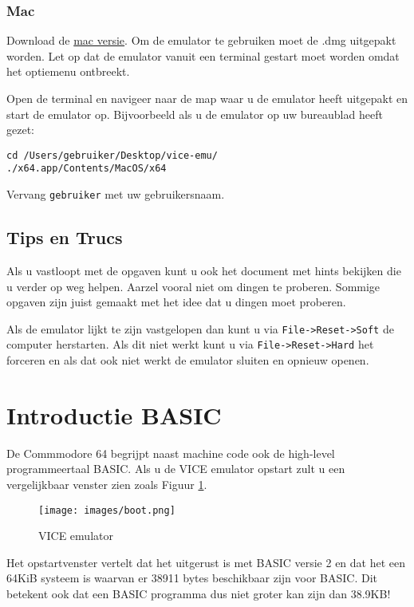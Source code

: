 \documentclass{article}
\begin{document}
\subsubsection{Mac}
Download de \href{http://sourceforge.net/projects/vice-emu/files/releases/binaries/macosx/vice-macosx-sdl-x86_64-10.12-3.1.dmg/download}{mac versie}.
Om de emulator te gebruiken moet de .dmg uitgepakt worden.
Let op dat de emulator vanuit een terminal gestart moet worden omdat het optiemenu ontbreekt.

Open de terminal en navigeer naar de map waar u de emulator heeft uitgepakt en start de emulator op. Bijvoorbeeld als u de emulator op uw bureaublad heeft gezet:
\begin{lstlisting}
cd /Users/gebruiker/Desktop/vice-emu/
./x64.app/Contents/MacOS/x64
\end{lstlisting}

Vervang \verb:gebruiker: met uw gebruikersnaam.

\subsection{Tips en Trucs}

Als u vastloopt met de opgaven kunt u ook het document met hints bekijken die u verder op weg helpen.
Aarzel vooral niet om dingen te proberen.
Sommige opgaven zijn juist gemaakt met het idee dat u dingen moet proberen.

Als de emulator lijkt te zijn vastgelopen dan kunt u via \verb:File->Reset->Soft: de computer herstarten.
Als dit niet werkt kunt u via \verb:File->Reset->Hard: het forceren en als dat ook niet werkt de emulator sluiten en opnieuw openen.

\section{Introductie BASIC}

De Commmodore 64 begrijpt naast machine code ook de high-level programmeertaal BASIC.
Als u de VICE emulator opstart zult u een vergelijkbaar venster zien zoals Figuur \ref{fig:vice}.

\begin{figure}
\centering
\texttt{[image: images/boot.png]}
\caption{VICE emulator}
\label{fig:vice}
\end{figure}

Het opstartvenster vertelt dat het uitgerust is met BASIC versie 2 en dat het een 64KiB systeem is waarvan er 38911 bytes beschikbaar zijn voor BASIC.
Dit betekent ook dat een BASIC programma dus niet groter kan zijn dan 38.9KB!
\end{document}
